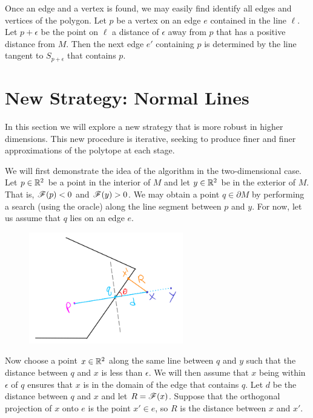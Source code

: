 \documentclass[12pt]{article}
\begin{document}
\begin{flushleft}
Once an edge and a vertex is found, we may easily find identify all edges and vertices of the polygon.
Let $p$ be a vertex on an edge $e$ contained in the line $\ell$.
Let $p+\epsilon$ be the point on $\ell$ a distance of $\epsilon$ away from $p$ that has a positive distance from $M$.
Then the next edge $e'$ containing $p$ is determined by the line tangent to $S_{p+\epsilon}$ that contains $p$.


\newpage

\section{New Strategy: Normal Lines}

In this section we will explore a new strategy that is more robust in higher dimensions.
This new procedure is iterative, seeking to produce finer and finer approximations of the polytope at each stage.

We will first demonstrate the idea of the algorithm in the two-dimensional case.
Let $p\in\mathbb{R}^2$ be a point in the interior of $M$ and let $y\in\mathbb{R}^2$ be in the exterior of $M$.
That is, $\mathscr{F}(p)<0$ and $\mathscr{F}(y)>0$.
We may obtain a point $q\in\partial M$ by performing a search (using the oracle) along the line segment between $p$ and $y$.
For now, let us assume that $q$ lies on an edge $e$.

\begin{figure}[H]
	\centering
	\includegraphics[width=0.6\textwidth]{2d.png}
\end{figure}

Now choose a point $x\in\mathbb{R}^2$ along the same line between $q$ and $y$ such that the distance between $q$ and $x$ is less than $\epsilon$.
We will then assume that $x$ being within $\epsilon$ of $q$ ensures that $x$ is in the domain of the edge that contains $q$.
Let $d$ be the distance between $q$ and $x$ and let $R=\mathscr{F}(x)$.
Suppose that the orthogonal projection of $x$ onto $e$ is the point $x'\in e$, so $R$ is the distance between $x$ and $x'$.


\end{flushleft}
\end{document}
